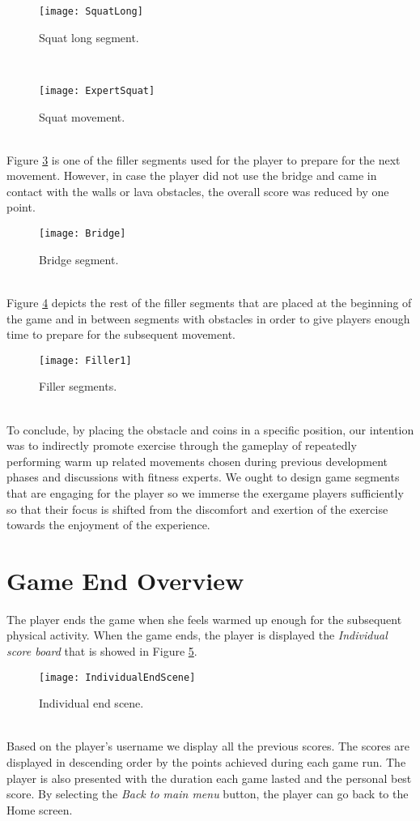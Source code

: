 \begin{figure}[h]
    \centering
    \texttt{[image: SquatLong]}
    \caption{Squat long segment.}
    \label{fig:squatlong}
\end{figure}\\
\begin{figure}[h]
    \centering
    \texttt{[image: ExpertSquat]}
    \caption{Squat movement.}
    \label{fig:squatlong}
\end{figure}\\
Figure \ref{fig:bridge} is one of the filler segments used for the player to prepare for the next movement. However, in case the player did not use the bridge and came in contact with the walls or lava obstacles, the overall score was reduced by one point.
\begin{figure}[h]
    \centering
    \texttt{[image: Bridge]}
    \caption{Bridge segment.}
    \label{fig:bridge}
\end{figure}\\
Figure \ref{fig:filler} depicts the rest of the filler segments that are placed at the beginning of the game and in between segments with obstacles in order to give players enough time to prepare for the subsequent movement.
\begin{figure}[h]
    \centering
    \texttt{[image: Filler1]}
    \caption{Filler segments.}
    \label{fig:filler}
\end{figure}\\
To conclude, by placing the obstacle and coins in a specific position, our intention was to indirectly promote exercise through the gameplay of repeatedly performing warm up related movements chosen during previous development phases and discussions with fitness experts. We ought to design game segments that are engaging for the player so we immerse the exergame players sufficiently so that their focus is shifted from the discomfort and exertion of the exercise towards the enjoyment of the experience.\pagebreak
\section{Game End Overview}
The player ends the game when she feels warmed up enough for the subsequent physical activity. When the game ends, the player is displayed the \textit{Individual score board} that is showed in Figure \ref{fig:individualend}.\\
\begin{figure}[h]
    \centering
    \texttt{[image: IndividualEndScene]}
    \caption{Individual end scene.}
    \label{fig:individualend}
\end{figure}\\
Based on the player's username we display all the previous scores. The scores are displayed in descending order by the points achieved during each game run. The player is also presented with the duration each game lasted and the personal best score. By selecting the \textit{Back to main menu} button, the player can go back to the Home screen. 

\label{endgamelabel}
